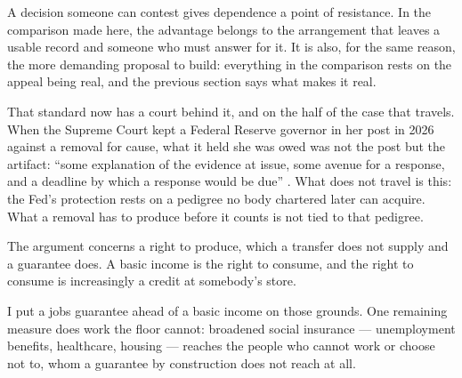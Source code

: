A decision someone can contest gives dependence a point of resistance. In the comparison made here, the advantage belongs to the arrangement that leaves a usable record and someone who must answer for it. It is also, for the same reason, the more demanding proposal to build: everything in the comparison rests on the appeal being real, and the previous section says what makes it real.

That standard now has a court behind it, and on the half of the case that travels. When the Supreme Court kept a Federal Reserve governor in her post in 2026 against a removal for cause, what it held she was owed was not the post but the artifact: “some explanation of the evidence at issue, some avenue for a response, and a deadline by which a response would be due” \autocite{cook2026}. What does not travel is this: the Fed's protection rests on a pedigree no body chartered later can acquire. What a removal has to produce before it counts is not tied to that pedigree.

The argument concerns a right to produce, which a transfer does not supply and a guarantee does. A basic income is the right to consume, and the right to consume is increasingly a credit at somebody's store.

I put a jobs guarantee ahead of a basic income on those grounds. One remaining measure does work the floor cannot: broadened social insurance — unemployment benefits, healthcare, housing — reaches the people who cannot work or choose not to, whom a guarantee by construction does not reach at all.
